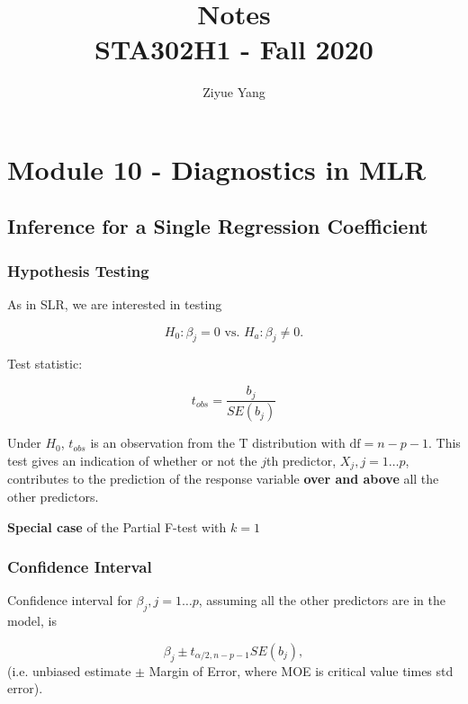 \documentclass[11pt]{article}
\title{Notes\\
  {\large STA302H1 - Fall 2020}}
\author{Ziyue Yang}
\theoremstyle{definition}
\numberwithin{equation}{section}
\begin{document}
\maketitle

\tableofcontents

\newpage

\section{Module 10 - Diagnostics in MLR}

\subsection{Inference for a Single Regression Coefficient}

\subsubsection{Hypothesis Testing}

As in SLR, we are interested in testing

\begin{equation}
  H_0: \beta_j = 0\text{ vs. }H_a: \beta_j\neq 0.
\end{equation}

Test statistic:

\begin{equation}
  t_{obs} = \frac{b_j}{SE(b_j)}
\end{equation}

Under $H_0$, $t_{obs}$ is an observation from the T distribution with $\text{df}=n-p-1$. This test gives an indication of whether or not the $j$th predictor, $X_j,j=1\dots p$, contributes to the prediction of the response variable \textbf{over and above} all the other predictors.

\textbf{Special case} of the Partial F-test with $k=1$

\subsubsection{Confidence Interval}

Confidence interval for $\beta_j, j=1\dots p$, assuming all the other predictors are in the model, is

\begin{equation}
  \beta_j \pm t_{\alpha/2, n-p-1}SE(b_j),
\end{equation}
(i.e. unbiased estimate $\pm$ Margin of Error, where MOE is critical value times std error).
\end{document}

